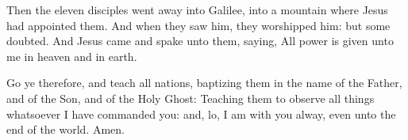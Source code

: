  Then the eleven disciples went away into Galilee, into a
mountain where Jesus had appointed them.  And when they saw
him, they worshipped him: but some doubted.  And Jesus came
and spake unto them, saying, All power is given unto me in heaven and in
earth.

 Go ye therefore, and teach all nations, baptizing them
in the name of the Father, and of the Son, and of the Holy Ghost:
 Teaching them to observe all things whatsoever I have
commanded you: and, lo, I am with you alway, even unto the end of the
world. Amen.

